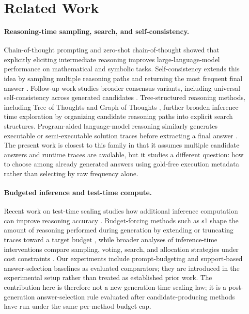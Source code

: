\section{Related Work}
\label{sec:related_work}

\paragraph{Reasoning-time sampling, search, and self-consistency.}
Chain-of-thought prompting \citep{wei2022chain} and zero-shot chain-of-thought \citep{kojima2022large} showed that explicitly eliciting intermediate reasoning improves large-language-model performance on mathematical and symbolic tasks.
Self-consistency extends this idea by sampling multiple reasoning paths and returning the most frequent final answer \citep{wang2023self}.
Follow-up work studies broader consensus variants, including universal self-consistency across generated candidates \citep{chen2023universalselfconsistency}.
Tree-structured reasoning methods, including Tree of Thoughts \citep{yao2023tree} and Graph of Thoughts \citep{besta2024graph}, further broaden inference-time exploration by organizing candidate reasoning paths into explicit search structures.
Program-aided language-model reasoning similarly generates executable or semi-executable solution traces before extracting a final answer \citep{gao2023pal}.
The present work is closest to this family in that it assumes multiple candidate answers and runtime traces are available, but it studies a different question: how to choose among already generated answers using gold-free execution metadata rather than selecting by raw frequency alone.

\paragraph{Budgeted inference and test-time compute.}
Recent work on test-time scaling studies how additional inference computation can improve reasoning accuracy \citep{snell2024scaling}.
Budget-forcing methods such as s1 shape the amount of reasoning performed during generation by extending or truncating traces toward a target budget \citep{muennighoff2025s1}, while broader analyses of inference-time interventions compare sampling, voting, search, and allocation strategies under cost constraints \citep{wu2024inference}.
Our experiments include prompt-budgeting and support-based answer-selection baselines as evaluated comparators; they are introduced in the experimental setup rather than treated as established prior work.
The contribution here is therefore not a new generation-time scaling law; it is a post-generation answer-selection rule evaluated after candidate-producing methods have run under the same per-method budget cap.

